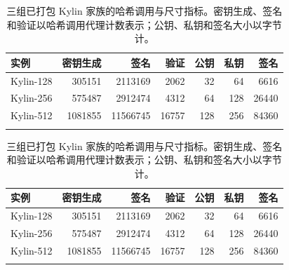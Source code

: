 \ifnum{}

\begin{table}[ht]
    \centering
    \caption{三组已打包 Kylin 家族的哈希调用与尺寸指标。密钥生成、签名和验证以哈希调用代理计数表示；公钥、私钥和签名大小以字节计。}
    \label{tab:comp tiny}
    \begin{tabular}{l r r r r r r}%
    \toprule
      实例 & 密钥生成 & 签名 & 验证 & 公钥 & 私钥 & 签名 \\ \midrule
      Kylin-128 & 305151 & 2113169 & 2062 & 32 & 64 & 6616 \\
      Kylin-256 & 575487 & 2912474 & 4312 & 64 & 128 & 26440 \\
      Kylin-512 & 1081855 & 11566745 & 16757 & 128 & 256 & 84360 \\
     \vspace{-1em} \\ \bottomrule
    \end{tabular}
\end{table}

\else
\begin{table}[th]
    \centering
    \caption{三组已打包 Kylin 家族的哈希调用与尺寸指标。密钥生成、签名和验证以哈希调用代理计数表示；公钥、私钥和签名大小以字节计。}
    \label{tab:comp tiny}
    \begin{tabular}{l r r r r r r}%
    \toprule
      实例 & 密钥生成 & 签名 & 验证 & 公钥 & 私钥 & 签名 \\ \midrule
      Kylin-128 & 305151 & 2113169 & 2062 & 32 & 64 & 6616 \\
      Kylin-256 & 575487 & 2912474 & 4312 & 64 & 128 & 26440 \\
      Kylin-512 & 1081855 & 11566745 & 16757 & 128 & 256 & 84360 \\
     \vspace{-1em} \\ \bottomrule
    \end{tabular}
\end{table}

\fi
